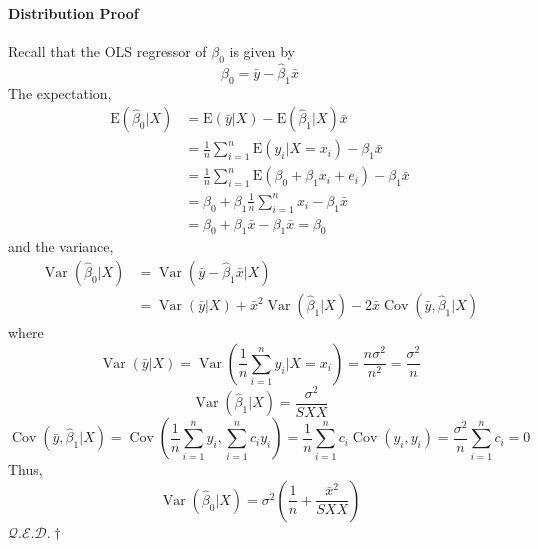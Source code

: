 \documentclass[11pt]{article}
\newcommand{\qed}{\hfill $\mathcal{Q}.\mathcal{E}.\mathcal{D}.\dagger$}
\begin{document}
\paragraph{Distribution Proof}
Recall that the OLS regressor of $\beta_0$ is given by
\begin{equation*}
    \hat{\beta}_{0}=\bar{y}-\hat{\beta}_{1} \bar{x}
\end{equation*}
The expectation,
\begin{align*}
    \mathrm{E}\left(\hat{\beta}_{0} | X\right)
    &= \mathrm{E}(\bar{y} | X)-\mathrm{E}\left(\hat{\beta}_{1} | X\right) \bar{x} \\
    &= \frac{1}{n} \sum_{i=1}^{n} \mathrm{E}\left(y_{i} | X=x_{i}\right) - \beta_{1} \bar{x} \\
    &= \frac{1}{n} \sum_{i=1}^{n} \mathrm{E}\left(\beta_{0}+\beta_{1} x_{i}+e_{i}\right) - \beta_{1} \bar{x} \\
    &= \beta_{0}+\beta_{1} \frac{1}{n} \sum_{i=1}^{n} x_{i} - \beta_{1} \bar{x} \\
    &= \beta_{0}+\beta_{1} \bar{x} - \beta_{1} \bar{x} = \beta_0
\end{align*}
and the variance,
\begin{align*}
    \operatorname{Var}\left(\hat{\beta}_{0} | X\right) &=\operatorname{Var}\left(\bar{y}-\hat{\beta}_{1} \bar{x} | X\right) \\ &=\operatorname{Var}(\bar{y} | X)+\bar{x}^{2} \operatorname{Var}\left(\hat{\beta}_{1} | X\right)-2 \bar{x} \operatorname{Cov}\left(\bar{y}, \hat{\beta}_{1} | X\right)
\end{align*}
where
\begin{equation*}
    \operatorname{Var}(\bar{y} | X)=\operatorname{Var}\left(\frac{1}{n} \sum_{i=1}^{n} y_{i} | X=x_{i}\right)=\frac{n \sigma^{2}}{n^{2}}=\frac{\sigma^{2}}{n}
\end{equation*}
\begin{equation*}
    \operatorname{Var}\left(\hat{\beta}_{1} | X\right)=\frac{\sigma^{2}}{S X X}
\end{equation*}
\begin{equation*}
    \operatorname{Cov}\left(\bar{y}, \hat{\beta}_{1} | X\right)=\operatorname{Cov}\left(\frac{1}{n} \sum_{i=1}^{n} y_{i}, \sum_{i=1}^{n} c_{i} y_{i}\right)=\frac{1}{n} \sum_{i=1}^{n} c_{i} \operatorname{Cov}\left(y_{i}, y_{i}\right)=\frac{\sigma^{2}}{n} \sum_{i=1}^{n} c_{i}=0
\end{equation*}
Thus,
\begin{equation*}
    \operatorname{Var}\left(\hat{\beta}_{0} | X\right)=\sigma^{2}\left(\frac{1}{n}+\frac{\bar{x}^{2}}{S X X}\right)
\end{equation*}
\qed
\end{document}

